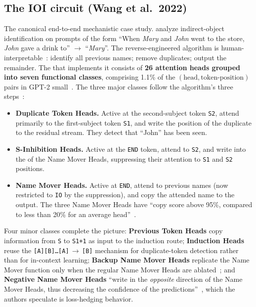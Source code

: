 \subsection{The IOI circuit (Wang et al.\ 2022)}
\label{sec:circuit-ioi}

The canonical end-to-end mechanistic case study. \citet{wang2022-ioi}
analyze indirect-object identification on prompts of the form ``When
\textit{Mary} and \textit{John} went to the store, \textit{John} gave a
drink to'' \(\to\) ``\textit{Mary}''. The reverse-engineered algorithm
is human-interpretable~\citep[\S 1]{wang2022-ioi}: identify all
previous names; remove duplicates; output the remainder. The 
that implements it consists of \textbf{26 attention heads grouped into
seven functional classes}, comprising 1.1\% of the
$(\text{head}, \text{token-position})$ pairs in GPT-2
small~\citep[Abstract]{wang2022-ioi}. The three major classes follow
the algorithm's three steps~\citep[\S 3]{wang2022-ioi}:
\begin{itemize}
  \item \textbf{Duplicate Token Heads.} Active at the second-subject
    token \texttt{S2}, attend primarily to the first-subject token
    \texttt{S1}, and write the position of the duplicate to the residual
    stream. They detect that ``John'' has been seen.
  \item \textbf{S-Inhibition Heads.} Active at the \texttt{END} token,
    attend to \texttt{S2}, and write into the \emph{} of the Name
    Mover Heads, suppressing their attention to \texttt{S1} and
    \texttt{S2} positions.
  \item \textbf{Name Mover Heads.} Active at \texttt{END}, attend to
    previous names (now restricted to \texttt{IO} by the suppression),
    and copy the attended name to the output. The three Name Mover
    Heads have ``copy score above 95\%, compared to less than 20\% for
    an average head''~\citep[\S 3.1]{wang2022-ioi}.
\end{itemize}
Four minor classes complete the picture: \textbf{Previous Token Heads}
copy information from \texttt{S} to \texttt{S1+1} as input to the
induction route; \textbf{Induction Heads} reuse the
\citet{olsson2022-induction-heads} \texttt{[A][B]\ldots[A]}$\,\to\,$\texttt{[B]}
mechanism for duplicate-token detection rather than for in-context
learning; \textbf{Backup Name Mover Heads} replicate the Name Mover
function only when the regular Name Mover Heads are
ablated~\citep[\S 3]{wang2022-ioi}; and \textbf{Negative Name Mover
Heads} ``write in the \emph{opposite} direction of the Name Mover
Heads, thus decreasing the confidence of the
predictions''~\citep[\S 3]{wang2022-ioi}, which the authors speculate
is loss-hedging behavior.

